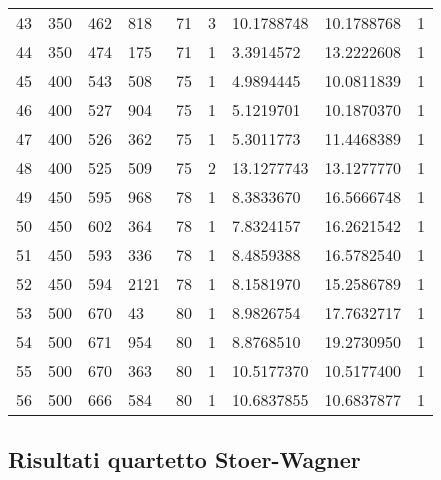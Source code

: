 \begin{longtable}{lllllllll}
  43 & 350 & 462 & 818 & 71 & 3 & 10.1788748 & 10.1788768 & 1 \\
  44 & 350 & 474 & 175 & 71 & 1 & 3.3914572 & 13.2222608 & 1 \\
  45 & 400 & 543 & 508 & 75 & 1 & 4.9894445 & 10.0811839 & 1 \\
  46 & 400 & 527 & 904 & 75 & 1 & 5.1219701 & 10.1870370 & 1 \\
  47 & 400 & 526 & 362 & 75 & 1 & 5.3011773 & 11.4468389 & 1 \\
  48 & 400 & 525 & 509 & 75 & 2 & 13.1277743 & 13.1277770 & 1 \\
  49 & 450 & 595 & 968 & 78 & 1 & 8.3833670 & 16.5666748 & 1 \\
  50 & 450 & 602 & 364 & 78 & 1 & 7.8324157 & 16.2621542 & 1 \\
  51 & 450 & 593 & 336 & 78 & 1 & 8.4859388 & 16.5782540 & 1 \\
  52 & 450 & 594 & 2121 & 78 & 1 & 8.1581970 & 15.2586789 & 1 \\
  53 & 500 & 670 & 43 & 80 & 1 & 8.9826754 & 17.7632717 & 1 \\
  54 & 500 & 671 & 954 & 80 & 1 & 8.8768510 & 19.2730950 & 1 \\
  55 & 500 & 670 & 363 & 80 & 1 & 10.5177370 & 10.5177400 & 1 \\
  56 & 500 & 666 & 584 & 80 & 1 & 10.6837855 & 10.6837877 & 1
  \end{longtable}


\subsection{Risultati quartetto Stoer-Wagner}

